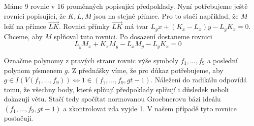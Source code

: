 \documentclass[12pt, a4paper]{article}
\begin{document}
Máme 9 rovnic v 16 proměnných popisující předpoklady. Nyní potřebujeme ještě rovnici popisující, že $K,L,M$ jsou na stejné přímce. Pro to stačí například, že $M$ leží na přímce $\overrightarrow{LK}$. Rovnici přímky $\overrightarrow{LK}$ má tvar $L_y x + (K_x - L_x)y - L_yK_x = 0$. Chceme, aby $M$ splňoval tuto rovnici. Po dosazení dostaneme rovnici 
\[L_yM_x + K_xM_y - L_xM_y - L_yK_x = 0\]

Označme polynomy z pravých stranr rovnic výše symboly $f_1, \dots, f_9$ a poslední polynom  písmenem $g$. Z přednášky víme, že pro důkaz potřebujeme, aby $g \in I(V(f_1, \dots, f_9)) \iff 1 \in (f_1, \dots, f_9, gt-1)$. Náležení do radikálu odpovídá tomu, že všechny body, které splňují předpoklady splňují i důsledek neboli dokazují větu. Stačí tedy spočítat normovanou Groebnerovu bázi ideálu $(f_1, \dots, f_9, gt-1)$ a zkontrolovat zda vyjde 1. V našem případě tyto rovnice postačují.
\end{document}
